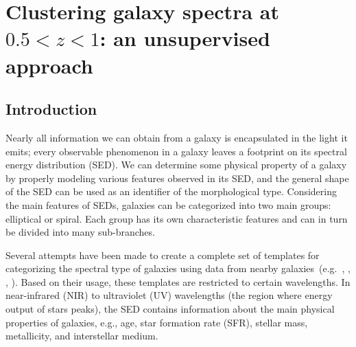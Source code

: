 \chapter[SOM: classifying high $Z$ galaxies]{Clustering galaxy spectra at $0.5<z<1$: an unsupervised approach}

\section{Introduction}
\label{sec: intro}
Nearly all information we can obtain from a galaxy is encapsulated in the light it emits; every observable phenomenon in a galaxy leaves a footprint on its spectral energy distribution (SED).
We can determine some physical property of a galaxy by properly modeling various features observed in its SED, and the general shape of the SED can be used as an identifier of the morphological type.
Considering the main features of SEDs, galaxies can be categorized into two main groups: elliptical or spiral.
Each group has its own characteristic features and can in turn be divided into many sub-branches.

Several attempts have been made to create a complete set of templates for categorizing the spectral type of galaxies using data from nearby galaxies~(e.g.~\citealt{Kinney93}, \citealt[][hereafter ]{Kinney96}, \citealt{Bershady00}, \citealt{Mannucci01}). 
Based on their usage, these templates are restricted to certain wavelengths.
In near-infrared (NIR) to ultraviolet (UV) wavelengths (the region where energy output of stars peaks), the SED contains information about the main physical properties of galaxies, e.g., age, star formation rate (SFR), stellar mass, metallicity, and interstellar medium.



